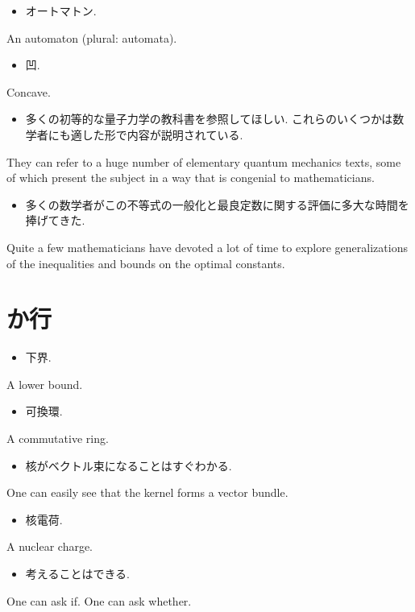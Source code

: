 \documentclass[openany, a4paper, oneside]{jsbook}
\begin{document}
\begin{itemize}
\item オートマトン.
\end{itemize}
An automaton (plural: automata).

\begin{itemize}
\item 凹.
\end{itemize}
Concave.

\begin{itemize}
\item 多くの初等的な量子力学の教科書を参照してほしい. これらのいくつかは数学者にも適した形で内容が説明されている. \cite{LiebSeiringer1}
\end{itemize}
They can refer to a huge number of elementary quantum mechanics texts,
some of which present the subject in a way that is congenial to mathematicians.

\begin{itemize}
\item 多くの数学者がこの不等式の一般化と最良定数に関する評価に多大な時間を捧げてきた. \cite{LiebSeiringer1}
\end{itemize}
Quite a few mathematicians have devoted a lot of time to explore generalizations of
the inequalities and bounds on the optimal constants.
\section{か行}

\begin{itemize}
\item 下界.
\end{itemize}
A lower bound.

\begin{itemize}
\item 可換環.
\end{itemize}
A commutative ring.

\begin{itemize}
\item 核がベクトル束になることはすぐわかる.
\end{itemize}
One can easily see that the kernel forms a vector bundle.

\begin{itemize}
\item 核電荷.
\end{itemize}
A nuclear charge.

\begin{itemize}
\item 考えることはできる. \cite{LiebSeiringer1}
\end{itemize}
One can ask if. One can ask whether.
\end{document}
